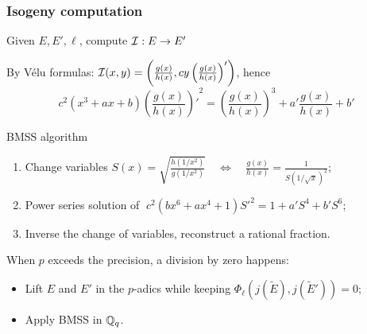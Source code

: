 \documentclass[10pt]{beamer}
\begin{document}
\begin{frame}
  \frametitle{Isogeny computation}
  
  \vspace{-1mm}

  \begin{center}
    \large
    Given $E, E', \ell$, compute $\mathcal{I}:E\to E'$
  \end{center}

  By Vélu formulas:
  $\mathcal{I}(x,y) = \left(\frac{g(x)}{h(x)}, cy\left(\frac{g(x)}{h(x)}\right)'\right)$,
  hence
  \[c^2(x^3 + ax + b){\left(\frac{g(x)}{h(x)}\right)'}^2 =
  \left(\frac{g(x)}{h(x)}\right)^3 + a'\frac{g(x)}{h(x)} + b'\]
  
  \vspace{-1mm}

  \begin{block}{BMSS algorithm \parencite{bostan+morain+salvy+schost08}}
    \begin{enumerate}
    \item Change variables $ S(x) =
      \sqrt{\frac{h(1/x^2)}{g(1/x^2)}} \quad\Leftrightarrow\quad
      \frac{g(x)}{h(x)} = \frac{1}{S(1/\sqrt{x})^2}$;
    \item Power series solution of 
      $\;c^2(bx^6 + ax^4 + 1){S'}^2 = 1 + a'S^4 + b'S^6$;
    \item Inverse the change of variables, reconstruct a rational
      fraction.
    \end{enumerate}
  \end{block}

  \vspace{-1mm}

  \begin{block}{\cite{lercier+sirvent08}}
    When $p$ exceeds the precision, a division by zero happens:
    \begin{itemize}
    \item Lift $E$ and $E'$ in the $p$-adics while keeping $\Phi_\ell\left(j(\tilde{E}),j(\tilde{E}')\right)=0$;
    \item Apply BMSS in $\mathbb{Q}_q$.
    \end{itemize}
  \end{block}
\end{frame}

\end{document}
